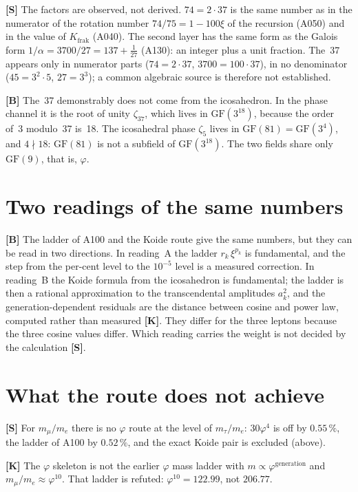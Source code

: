 \textbf{[S]} The factors are observed, not derived. $74=2\cdot37$ is the same
number as in the numerator of the rotation number $74/75=1-100\xi$ of the
recursion (A050) and in the value of $K_\text{frak}$ (A040). The second layer
has the same form as the Galois form $1/\alpha=3700/27=137+\tfrac1{27}$
(A130): an integer plus a unit fraction. The~37 appears only in numerator parts
($74=2\cdot37$, $3700=100\cdot37$), in no denominator ($45=3^2\cdot5$,
$27=3^3$); a common algebraic source is therefore not established.

\textbf{[B]} The~37 demonstrably does not come from the icosahedron. In the
phase channel it is the root of unity $\zeta_{37}$, which lives in
$\mathrm{GF}(3^{18})$, because the order of~3 modulo~37 is~18. The icosahedral
phase $\zeta_5$ lives in $\mathrm{GF}(81)=\mathrm{GF}(3^4)$, and $4\nmid18$:
$\mathrm{GF}(81)$ is not a subfield of $\mathrm{GF}(3^{18})$. The two fields
share only $\mathrm{GF}(9)$, that is, $\varphi$.

\section{Two readings of the same numbers}

\textbf{[B]} The ladder of A100 and the Koide route give the same numbers, but
they can be read in two directions. In reading~A the ladder
$r_k\,\xi^{p_k}$ is fundamental, and the step from the per-cent level to the
$10^{-5}$ level is a measured correction. In reading~B the Koide formula from
the icosahedron is fundamental; the ladder is then a rational approximation to
the transcendental amplitudes $a_k^2$, and the generation-dependent residuals
are the distance between cosine and power law, computed rather than measured
\textbf{[K]}. They differ for the three leptons because the three cosine values
differ. Which reading carries the weight is not decided by the calculation
\textbf{[S]}.

\section{What the route does not achieve}

\textbf{[S]} For $m_\mu/m_e$ there is no $\varphi$ route at the level of
$m_\tau/m_e$: $30\varphi^4$ is off by $0.55\,\%$, the ladder of A100 by
$0.52\,\%$, and the exact Koide pair is excluded (above).

\textbf{[K]} The $\varphi$ skeleton is not the earlier $\varphi$ mass ladder
with $m\propto\varphi^{\text{generation}}$ and $m_\mu/m_e\approx\varphi^{10}$.
That ladder is refuted: $\varphi^{10}=122.99$, not $206.77$.

